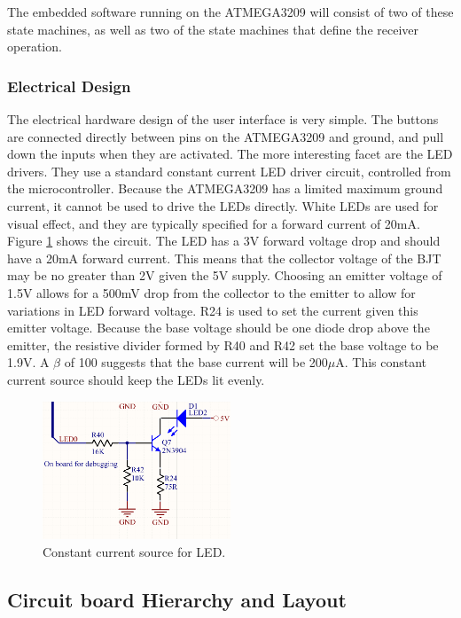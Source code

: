 \documentclass{article}
\begin{document}
	The embedded software running on the ATMEGA3209 will consist of two of these state machines, as well as two of the state machines that define the receiver operation.

	\subsubsection{Electrical Design}
	The electrical hardware design of the user interface is very simple.  The buttons are connected directly between pins on the ATMEGA3209 and ground, and pull down the inputs when they are activated.  The more interesting facet are the LED drivers.  They use a standard constant current LED driver circuit, controlled from the microcontroller.  Because the ATMEGA3209 has a limited maximum ground current, it cannot be used to drive the LEDs directly.  White LEDs are used for visual effect, and they are typically specified for a forward current of 20mA.  Figure \ref{fig:LEDdriver} shows the circuit.  The LED has a 3V forward voltage drop and should have a 20mA forward current.  This means that the collector voltage of the BJT may be no greater than 2V given the 5V supply.  Choosing an emitter voltage of 1.5V allows for a 500mV drop from the collector to the emitter to allow for variations in LED forward voltage.  R24 is used to set the current given this emitter voltage.  Because the base voltage should be one diode drop above the emitter, the resistive divider formed by R40 and R42 set the base voltage to be 1.9V.  A $\beta$ of 100 suggests that the base current will be 200$\mu$A.  This constant current source should keep the LEDs lit evenly.

	\begin{figure}
		\centering
		\includegraphics[width = 0.5\textwidth]{PR4Images/LEDconstcurrentdriver.PNG}
		\caption{Constant current source for LED.}
		\label{fig:LEDdriver}
	\end{figure}

	\color{black}

	\subsection{Circuit board Hierarchy and Layout}
\end{document}
